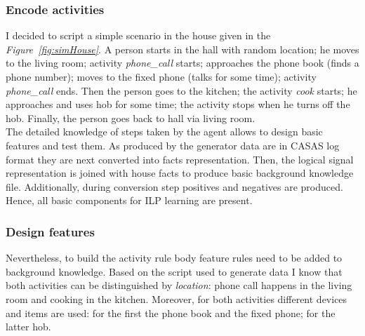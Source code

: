 \documentclass[10pt, a4paper, pdflatex, leqno, twoside, openright]{report}
\begin{document}
      \subsubsection{Encode activities}
I decided to script a simple scenario in the house given in the \emph{Figure~\ref{fig:simHouse}}. A person starts in the hall with random location; he moves to the living room; activity \emph{phone\_call} starts; approaches the phone book (finds a phone number); moves to the fixed phone (talks for some time); activity \emph{phone\_call} ends. Then the person goes to the kitchen; the activity \emph{cook} starts; he approaches and uses hob for some time; the activity stops when he turns off the hob. Finally, the person goes back to hall via living room.\\

The detailed knowledge of steps taken by the agent allows to design basic features and test them. As produced by the generator data are in CASAS log format they are next converted into facts representation. Then, the logical signal representation is joined with house facts to produce basic background knowledge file. Additionally, during conversion step positives and negatives are produced. Hence, all basic components for ILP learning are present.

      \subsubsection{Design features}
Nevertheless, to build the activity rule body feature rules need to be added to background knowledge. Based on the script used to generate data I know that both activities can be distinguished by \emph{location}: phone call happens in the living room and cooking in the kitchen. Moreover, for both activities different devices and items are used: for the first the phone book and the fixed phone; for the latter hob.\\
\end{document}
